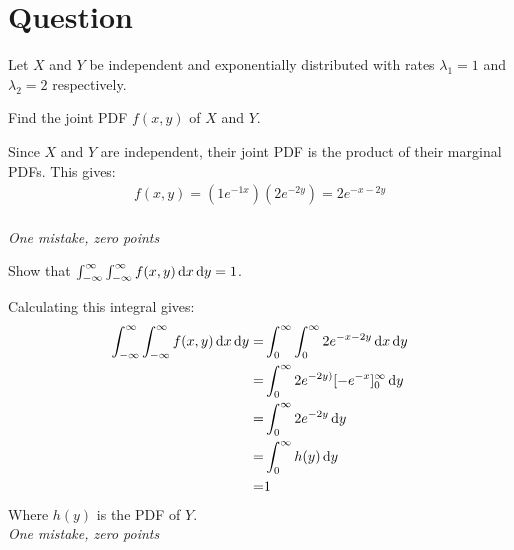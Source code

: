 \section*{Question}

Let $X$ and $Y$ be independent and exponentially distributed with rates $\lambda_1 = 1$ and $\lambda_2 = 2$ respectively.
\begin{exercise}[0.5]
Find the joint PDF $f(x,y)$ of $X$ and $Y$.
\begin{solution}
    Since $X$ and $Y$ are independent, their joint PDF is the product of their marginal PDFs. This gives:
    \begin{align*}
        f(x,y) = (1e^{-1x})(2e^{-2y}) = 2e^{-x-2y}
    \end{align*} \\
    \textit{One mistake, zero points}
\end{solution}
\end{exercise}

\begin{exercise}[0.5]
Show that $\int_{-\infty}^\infty \int_{-\infty}^\infty f(x,y) \,\textrm{d}x \,\textrm{d}y = 1$.
\begin{solution}
    Calculating this integral gives:
    \begin{align*}
      \int_{-\infty}^\infty \int_{-\infty}^\infty f(x,y) \,\textrm{d}x \,\textrm{d}y =& \int_0^\infty \int_0^\infty 2e^{-x-2y} \,\textrm{d}x \,\textrm{d}y \\
      =& \int_0^\infty 2e^{-2y)}[-e^{-x}]_0^\infty \,\textrm{d}y \\
      =& \int_0^\infty 2e^{-2y} \,\textrm{d}y \\
      =& \int_0^\infty h(y) \,\textrm{d}y \\
      =& 1
    \end{align*}
    Where $h(y)$ is the PDF of $Y$. \\
    \textit{One mistake, zero points}
\end{solution}
\end{exercise}

